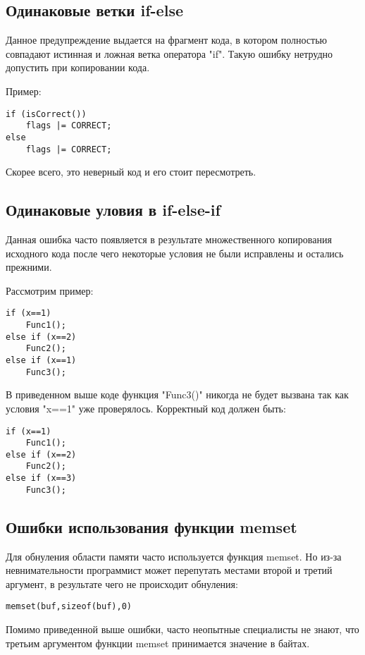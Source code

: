 \subsection{Одинаковые ветки if-else}
\label{sec:eqStmt}
Данное предупреждение выдается на фрагмент кода, в котором полностью совпадают истинная и ложная ветка 
оператора "if". Такую ошибку нетрудно допустить при копировании кода.

Пример:
\begin{lstlisting}
if (isCorrect())
	flags |= CORRECT;
else
	flags |= CORRECT;
\end{lstlisting}

Скорее всего, это неверный код и его стоит пересмотреть.

\subsection{Одинаковые уловия в if-else-if}
\label{sec:eqCond}
Данная ошибка часто появляется в результате множественного копирования исходного кода после чего 
некоторые условия не были исправлены и остались прежними.

Рассмотрим пример:
\begin{lstlisting}
if (x==1)
	Func1();
else if (x==2)
	Func2();
else if (x==1)
	Func3();
\end{lstlisting}

В приведенном выше коде функция "Func3()" никогда не будет вызвана так как условия "x==1" уже
проверялось. Корректный код должен быть:
\begin{lstlisting}
if (x==1)
	Func1();
else if (x==2)
	Func2();
else if (x==3)
	Func3();
\end{lstlisting}

\subsection{Ошибки использования функции memset}
\label{sec:memset}
Для обнуления области памяти часто используется функция memset. Но из-за невнимательности программист может 
перепутать местами второй и третий аргумент, в результате чего не происходит обнуления:
\begin{lstlisting}
memset(buf,sizeof(buf),0)
\end{lstlisting}
Помимо приведенной выше ошибки, часто неопытные специалисты не знают, что третьим аргументом 
функции memset принимается значение в байтах.

